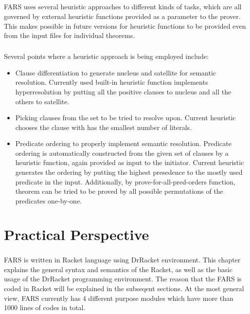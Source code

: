 \documentclass[11pt]{report}
\begin{document}
\paragraph{} FARS uses several heuristic approaches to different kinds of tasks, which are all governed by external heuristic functions provided as a parameter to the prover. This makes possible in future versions for heuristic functions to be provided even from the input files for individual theorems.

\paragraph{} Several points where a heuristic approach is being employed include:

\begin{itemize}
 \item Clause differentiation to generate nucleus and satellite for semantic resolution. Currently used built-in heuristic function implements hyperresolution by putting all the positive clauses to nucleus and all the others to satellite.
 \item Picking clauses from the set to be tried to resolve upon. Current heuristic chooses the clause with has the smallest number of literals.
 \item Predicate ordering to properly implement semantic resolution. Predicate ordering is automatically constructed from the given set of clauses by a heuristic function, again provided as input to the initiator. Current heuristic generates the ordering by putting the highest presedence to the mostly used predicate in the input. Additionally, by prove-for-all-pred-orders function, theorem can be tried to be proved by all possible permutations of the predicates one-by-one.
\end{itemize}


\chapter{Practical Perspective}

\paragraph{} FARS is written in Racket language using DrRacket environment. This chapter explains the general syntax and semantics of the Racket, as well as the basic usage of the DrRacket programming environment. The reason that the FARS is coded in Racket will be explained in the subseqent sections. At the most general view, FARS currently has 4 different purpose modules which have more than 1000 lines of codes in total. 
\end{document}

